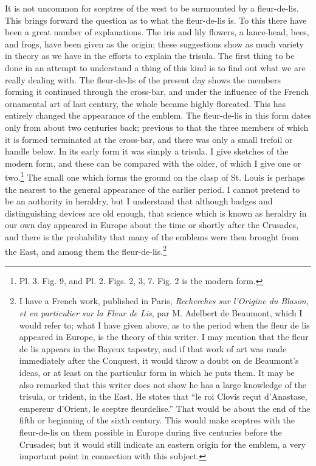 \documentclass[a4paper, 11pt, oneside, english, landscape, twocolumn]{article}
\begin{document}
It is not uncommon for sceptres of the west to be surmounted by a fleur-de-lis. This brings forward the question as to what the fleur-de-lis is. To this there have been a great number of explanations. The iris and lily flowers, a lance-head, bees, and frogs, have been given as the origin; these suggestions show as much variety in theory as we have in the efforts to explain the trisula. The first thing to be done in an attempt to understand a thing of this kind is to find out what we are really dealing with. The fleur-de-lis of the present day shows the members forming it continued through the cross-bar, and under the influence of the French ornamental art of last century, the whole became highly floreated. This has entirely changed the appearance of the emblem. The fleur-de-lis in this form dates only from about two centuries back; previous to that the three members of which it is formed terminated at the cross-bar, and there was only a small trefoil or handle below. In its early form it was simply a trisula. I give sketches of the modern form, and these can be compared with the older, of which I give one or two.\footnote{Pl. 3. Fig. 9, and Pl. 2. Figs. 2, 3, 7. Fig. 2 is the modern form.} The small one which forms the ground on the clasp of St. Louis is perhaps the nearest to the general appearance of the earlier period. I cannot pretend to be an authority in heraldry, but I understand that although badges and distinguishing devices are old enough, that science which is known as heraldry in our own day appeared in Europe about the time or shortly after the Crusades, and there is the probability that many of the emblems were then brought from the East, and among them the fleur-de-lis.\footnote{I have a French work, published in Paris, \emph{Recherches sur l'Origine du Blason, et en particulier sur la Fleur de Lis}, par M. Adelbert de Beaumont, which I would refer to; what I have given above, as to the period when the fleur de lis appeared in Europe, is the theory of this writer. I may mention that the fleur de lis appears in the Bayeux tapestry, and if that work of art was made immediately after the Conquest, it would throw a doubt on de Beaumont's ideas, or at least on the particular form in which he puts them. It may be also remarked that this writer does not show he has a large knowledge of the trisula, or trident, in the East. He states that ``le roi Clovis reçut d'Anastase, empereur d'Orient, le sceptre fleurdelise.'' That would be about the end of the fifth or beginning of the sixth century. This would make sceptres with the fleur-de-lis on them possible in Europe during five centuries before the Crusades; but it would still indicate an eastern origin for the emblem, a very important point in connection with this subject.}
\end{document}
